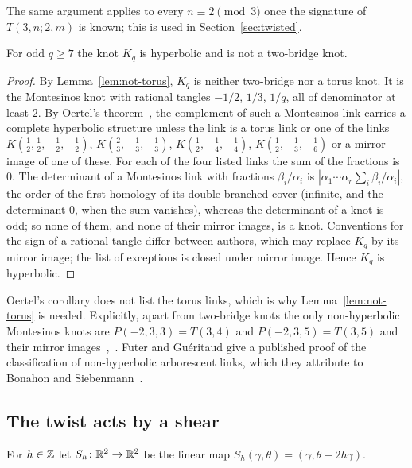 The same argument applies to every $n\equiv2\pmod3$ once the signature of $T(3,n;2,m)$ is known; this is used in
Section~\ref{sec:twisted}.

\begin{proposition}\label{prop:hyperbolic}
For odd $q\ge7$ the knot $K_q$ is hyperbolic and is not a two-bridge knot.
\end{proposition}

\begin{proof}
By Lemma~\ref{lem:not-torus}, $K_q$ is neither two-bridge nor a torus knot. It is the Montesinos knot with rational
tangles $-1/2$, $1/3$, $1/q$, all of denominator at least $2$. By Oertel's theorem~\cite[Cor.~5]{Oertel}, the
complement of such a Montesinos link carries a complete hyperbolic structure unless the link is a torus link or one
of the links $K(\tfrac12,\tfrac12,-\tfrac12,-\tfrac12)$, $K(\tfrac23,-\tfrac13,-\tfrac13)$, $K(\tfrac12,-\tfrac14,-\tfrac14)$,
$K(\tfrac12,-\tfrac13,-\tfrac16)$ or a mirror image of one of these. For each of the four listed links the sum of the
fractions is $0$. The determinant of a Montesinos link with fractions $\beta_i/\alpha_i$ is
$|\alpha_1\cdots\alpha_r\sum_i\beta_i/\alpha_i|$, the order of the first homology of its double branched cover (infinite,
and the determinant $0$, when the sum vanishes), whereas the determinant of a knot is odd; so none of them, and none
of their mirror images, is a knot. Conventions for the sign of a rational tangle differ between authors, which may replace $K_q$ by its
mirror image; the list of exceptions is closed under mirror image. Hence $K_q$ is hyperbolic.
\end{proof}

Oertel's corollary does not list the torus links, which is why Lemma~\ref{lem:not-torus} is needed. Explicitly,
apart from two-bridge knots the only non-hyperbolic Montesinos knots are $P(-2,3,3)=T(3,4)$ and $P(-2,3,5)=T(3,5)$
and their mirror images~\cite[Rem.~1]{IchiharaJong},~\cite[p.~440]{Meier}. Futer and Gu\'eritaud give a published
proof of the classification of non-hyperbolic arborescent links, which they attribute to Bonahon and
Siebenmann~\cite[Thm.~1.5]{FutGue}.

\subsection{The twist acts by a shear}\label{ss:shear}

For $h\in\mathbb{Z}$ let $S_h\colon\mathbb{R}^2\to\mathbb{R}^2$ be the linear map $S_h(\gamma,\theta)=(\gamma,\theta-2h\gamma)$.

